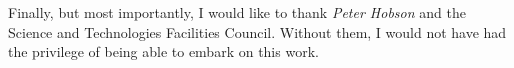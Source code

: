 \documentclass[11pt,a4paper]{report}
\begin{document}
Finally, but most importantly, I would like to thank \textit{Peter Hobson} and the Science and Technologies Facilities Council.
Without them, I would not have had the privilege of being able to embark on this work. 

\tableofcontents
\listoftables
\listoffigures



















\begin{appendices}
%


\end{appendices}



 
\end{document}
